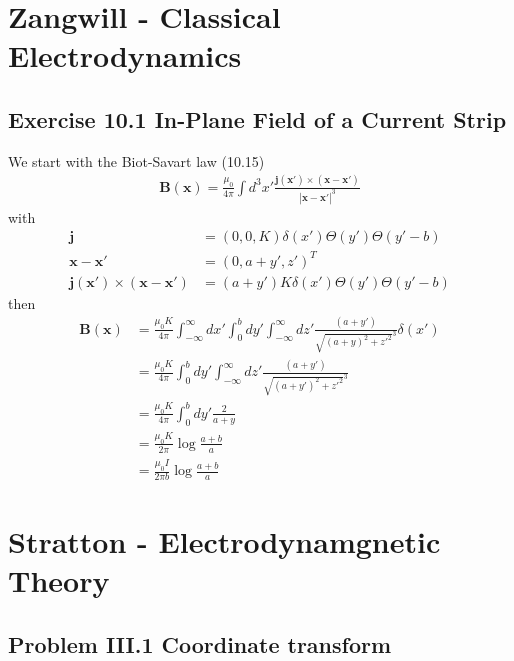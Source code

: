 \documentclass[../main.tex]{subfiles}
\begin{document}
\section{{\sc Zangwill} - Classical Electrodynamics}
\subsection{Exercise 10.1 In-Plane Field of a Current Strip}
We start with the Biot-Savart law (10.15)
\begin{align}
\mathbf{B}(\mathbf{x})=\frac{\mu_0}{4\pi}\int d^3x'\frac{\mathbf{j}(\mathbf{x}')\times(\mathbf{x}-\mathbf{x}')}{|\mathbf{x}-\mathbf{x}'|^3}
\end{align}
with
\begin{align}
\mathbf{j}&=(0,0,K)\delta(x')\Theta(y')\Theta(y'-b)\\
\mathbf{x}-\mathbf{x}'&=(0,a+y',z')^T\\
\mathbf{j}(\mathbf{x}')\times(\mathbf{x}-\mathbf{x}')&=(a+y')K\delta(x')\Theta(y')\Theta(y'-b)
\end{align}
then
\begin{align}
\mathbf{B}(\mathbf{x})
&=\frac{\mu_0K}{4\pi}\int_{-\infty}^\infty dx'\int_0^b dy'\int_{-\infty}^\infty dz'\frac{(a+y')}{\sqrt{(a+y)^2+z'^2}^3}\delta(x')\\
&=\frac{\mu_0K}{4\pi}\int_0^b dy'\int_{-\infty}^\infty dz'\frac{(a+y')}{\sqrt{(a+y')^2+z'^2}^3}\\
&=\frac{\mu_0K}{4\pi}\int_0^b dy'\frac{2}{a+y}\\
&=\frac{\mu_0K}{2\pi}\log\frac{a+b}{a}\\
&=\frac{\mu_0I}{2\pi b}\log\frac{a+b}{a}
\end{align}


\section{{\sc Stratton} - Electrodynamgnetic Theory}
\subsection{Problem III.1 Coordinate transform}
\end{document}

